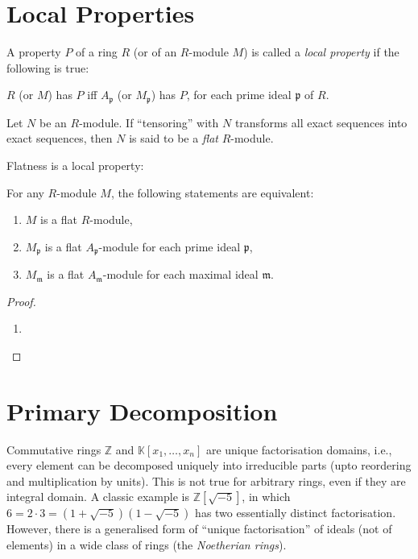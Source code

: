 \section{Local Properties}
\begin{definition}
    A property \( P \) of a ring  \( R \) (or of an \( R \)-module  \( M \)) is called a  \emph{local property} if the following is true:

    \( R \) (or \( M \)) has \( P \) iff  \( A_{\mathfrak{p}} \) (or \( M_{\mathfrak{p}} \)) has \( P \), for each prime ideal  \( \mathfrak{p} \) of \( R \).

    \begin{definition}
        Let \( N \) be an  \( R \)-module. If ``tensoring'' with  \( N \) transforms all exact sequences into exact sequences, then \( N \) is said to be a \emph{flat} \( R \)-module.
    \end{definition}
    Flatness is a local property:
    \begin{proposition}
        For any \( R \)-module  \( M \), the following statements are equivalent:
        \begin{enumerate}[label=\roman*)]
            \item \( M \) is a flat  \( R \)-module,
            \item  \( M_{\mathfrak{p}} \) is a flat \( A_{\mathfrak{p}} \)-module for each prime ideal \( \mathfrak{p} \),
            \item \( M_{\mathfrak{m}} \) is a flat \( A_{\mathfrak{m}} \)-module for each maximal ideal \( \mathfrak{m} \).
        \end{enumerate}
    \end{proposition}
    \begin{proof}
        \begin{enumerate}[label=\roman*)]
          \item 
        \end{enumerate}
    \end{proof}
\end{definition}
\section{Primary Decomposition}
Commutative rings \( \mathbb{Z} \) and \( \mathbb{K}[x_1, \ldots, x_n] \) are unique factorisation domains, i.e., every element can be decomposed uniquely into irreducible parts (upto reordering and multiplication by units). This is not true for arbitrary rings, even if they are integral domain. A classic example is \( \mathbb{Z}[\sqrt{-5}] \), in which \( 6 = 2 \cdot 3 = (1 + \sqrt{-5}) (1 - \sqrt{-5}) \) has two essentially distinct factorisation. However, there  is a generalised form of ``unique factorisation'' of ideals (not of elements) in a wide class of rings (the \emph{Noetherian rings}).

